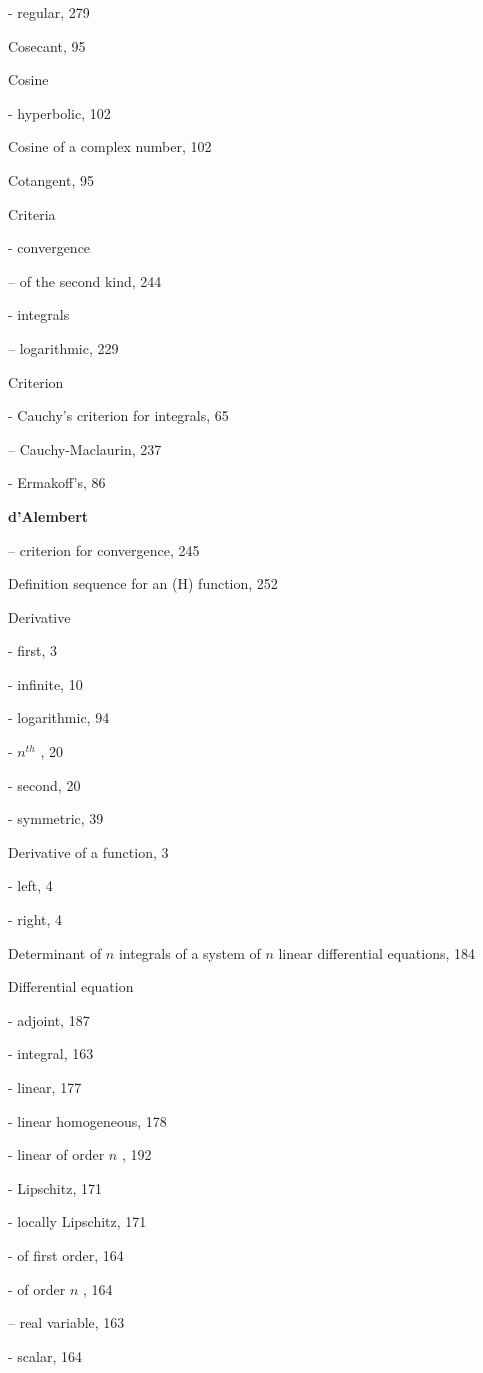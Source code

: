 - regular, 279

Cosecant, 95

Cosine

- hyperbolic, 102

Cosine of a complex number, 102

Cotangent, 95

Criteria

- convergence

-- of the second kind, 244

- integrals

-- logarithmic, 229

Criterion

- Cauchy's criterion for integrals, 65

-- Cauchy-Maclaurin, 237

- Ermakoff's, 86

\par\noindent\textbf{d'Alembert}\par

-- criterion for convergence, 245

Definition sequence for an (H) function, 252

Derivative

- first, 3

- infinite, 10

- logarithmic, 94

- \(n^{th}\) , 20

- second, 20

- symmetric, 39

Derivative of a function, 3

- left, 4

- right, 4

Determinant of \(n\) integrals of a system of \(n\) linear differential equations, 184

Differential equation

- adjoint, 187

- integral, 163

- linear, 177

- linear homogeneous, 178

- linear of order \(n\) , 192

- Lipschitz, 171

- locally Lipschitz, 171

- of first order, 164

- of order \(n\) , 164

-- real variable, 163

- scalar, 164

